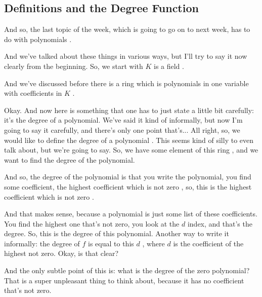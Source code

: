 \subsection{Definitions and the Degree Function}

\begin{speech}[00:22:20 - 00:23:46]
And so, the last topic of the week, which is going to go on to next week, has to do with polynomials .

And we've talked about these things in various ways, but I'll try to say it now clearly from the beginning. So, we start with $K$ is a field .

And we've discussed before there is a ring which is polynomials in one variable  with coefficients in $K$ .

Okay. And now here is something that one has to just state a little bit carefully: it's the degree of a polynomial. We've said it kind of informally, but now I'm going to say it carefully, and there's only one point that's... All right, so, we would like to define the degree of a polynomial . This seems kind of silly to even talk about, but we're going to say. So, we have some element of this ring , and we want to find the degree of the polynomial.
\end{speech}

\begin{hidden}
\end{hidden}

\begin{speech}[00:23:46 - 00:25:16]
And so, the degree of the polynomial is that you write the polynomial, you find some coefficient, the highest coefficient which is not zero , so, this is the highest coefficient  which is not zero .

And that makes sense, because a polynomial is just some list of these coefficients. You find the highest one that's not zero, you look at the $d$ index, and that's the degree. So, this is the degree of this polynomial. Another way to write it informally: the degree of $f$ is equal to this $d$ , where $d$ is the coefficient of the highest not zero. Okay, is that clear?

And the only subtle point of this is: what is the degree of the zero polynomial?  That is a super unpleasant thing to think about, because it has no coefficient that's not zero.
\end{speech}

